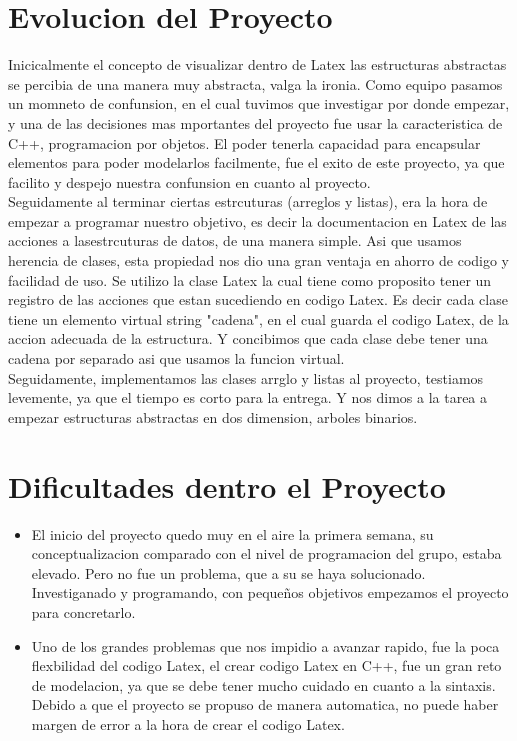 \documentclass[12pt,letterpaper]{article}     %
\begin{document}
\section{Evolucion del Proyecto}

Inicicalmente el concepto de visualizar dentro de Latex las estructuras abstractas se percibia de una manera muy abstracta, valga la ironia. Como equipo pasamos un momneto de confunsion, en el cual tuvimos que investigar por donde empezar, y una de las decisiones mas mportantes del proyecto fue usar la caracteristica de C++, programacion por objetos. El poder tenerla capacidad para encapsular elementos para poder modelarlos facilmente, fue el exito de este proyecto, ya que facilito y despejo nuestra confunsion en cuanto al proyecto.\\

Seguidamente al terminar ciertas estrcuturas (arreglos y listas), era la hora de empezar a programar nuestro objetivo, es decir la documentacion en Latex de las acciones a lasestrcuturas de datos, de una manera simple. Asi que usamos herencia de clases, esta propiedad nos dio una gran ventaja en ahorro de codigo y facilidad de uso. Se utilizo la clase Latex la cual tiene como proposito tener un registro de las acciones que estan sucediendo en codigo Latex. Es decir cada clase tiene un elemento virtual string "cadena", en el cual guarda el codigo Latex, de la accion adecuada de la estructura. Y concibimos que cada clase debe tener una cadena por separado asi que usamos la funcion virtual.\\

Seguidamente, implementamos las clases arrglo y listas al proyecto, testiamos levemente, ya que el tiempo es corto para la entrega. Y nos dimos a la tarea a empezar estructuras abstractas en dos dimension, arboles binarios.\\


\section{Dificultades dentro el Proyecto}

\begin{itemize}

\item El inicio del proyecto quedo muy en el aire la primera semana, su conceptualizacion comparado con el nivel de programacion del grupo, estaba elevado. Pero no fue un problema, que a su se haya solucionado. Investiganado y programando, con pequeños objetivos empezamos el proyecto para concretarlo.

\item Uno de los grandes problemas que nos impidio a avanzar rapido, fue la poca flexbilidad del codigo Latex, el crear codigo Latex en C++, fue un gran reto de modelacion, ya que se debe tener mucho cuidado en cuanto a la sintaxis. Debido a que el proyecto se propuso de manera automatica, no puede haber margen de error a la hora de crear el codigo Latex.

\end{itemize} 
\end{document}
